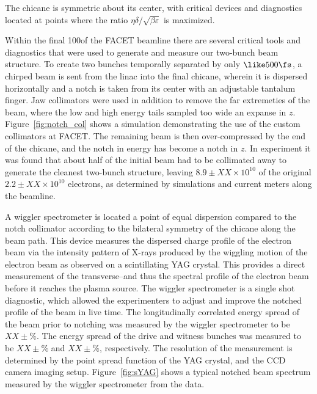 The chicane is symmetric about its center, with critical devices and diagnostics located at points where the ratio $\eta \delta / \sqrt{ \beta \varepsilon}$ is maximized.

Within the final 100\m of the FACET beamline there are several
critical tools and diagnostics that were used to generate and measure
our two-bunch beam structure. To create two bunches temporally
separated by only ${\like 500\fs}$, a chirped beam is sent from the
linac into the final chicane, wherein it is dispersed horizontally and
a notch is taken from its center with an adjustable tantalum
finger. Jaw collimators were used in addition to remove the far
extremeties of the beam, where the low and high energy tails sampled
too wide an expanse in $z$. Figure~\ref{fig:notch_col} shows a
simulation demonstrating the use of the custom collimators at
FACET. The remaining beam is then over-compressed by the end of the
chicane, and the notch in energy has become a notch in $z$. In
experiment it was found that about half of the initial beam had to be
collimated away to generate the cleanest two-bunch structure, leaving
${8.9 \pm XX \times 10^{10}}$ of the original ${2.2 \pm XX \times
10^{10}}$ electrons, as determined by simulations and current meters
along the beamline.

A wiggler spectrometer is located a point of equal dispersion compared
to the notch collimator according to the bilateral symmetry of the
chicane along the beam path. This device measures the dispersed charge
profile of the electron beam via the intensity pattern of X-rays
produced by the wiggling motion of the electron beam as observed on a
scintillating YAG crystal. This provides a direct measurement of the
transverse--and thus the spectral profile of the electron beam before
it reaches the plasma source. The wiggler spectrometer is a single
shot diagnostic, which allowed the experimenters to adjust and improve
the notched profile of the beam in live time. The longitudinally
correlated energy spread of the beam prior to notching was measured by
the wiggler spectrometer to be ${XX \pm \%}$. The energy spread of the
drive and witness bunches was measured to be ${XX \pm \%}$ and
${XX \pm \%}$, respectively. The resolution of the measurement is
determined by the point spread function of the YAG crystal, and the
CCD camera imaging setup. Figure~\ref{fig:sYAG} shows a typical
notched beam spectrum measured by the wiggler spectrometer from the
data.

